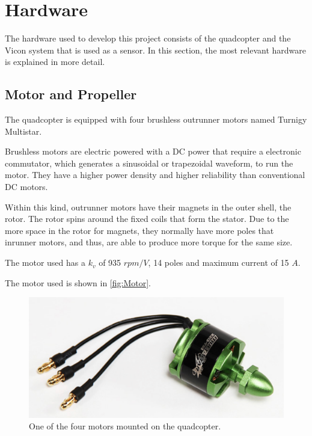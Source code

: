 \section{Hardware}
The hardware used to develop this project consists of the quadcopter and the Vicon system that is used as a sensor. In this section, the most relevant hardware is explained in more detail. \cite{YDing}

\subsection{Motor and Propeller}
The quadcopter is equipped with four brushless outrunner motors named Turnigy Multistar. 

Brushless motors are electric powered with a DC power that require a electronic commutator, which generates a sinusoidal or trapezoidal waveform, to run the motor. They have a higher power density and higher reliability than conventional DC motors.

Within this kind, outrunner motors have their magnets in the outer shell, the rotor. The rotor spins around the fixed coils that form the stator. Due to the more space in the rotor for magnets, they normally have more poles that inrunner motors, and thus, are able to produce more torque for the same size.  

The motor used has a $k_v$ of 935 $rpm/V$, 14 poles and maximum current of 15 $A$. 

The motor used is shown in \autoref{fig:Motor}.
\begin{figure}[H]
	\centering
	\includegraphics[scale=0.5]{figures/motor.png}
	\caption{One of the four motors mounted on the quadcopter.}
	\label{fig:Motor}
\end{figure} 


